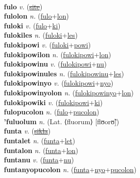  \label{fititelum} \\
\textbf{fulo} \textit{v.} (\hyperref[site]{\sout{site}})
 \label{fulo} \\
\textbf{fulolon} \textit{n.} (\hyperref[fulo]{fulo}+\hyperref[lon]{lon})
 \label{fulolon} \\
\textbf{fuloki} \textit{v.} (\hyperref[fulo]{fulo}+\hyperref[ki]{ki})
 \label{fuloki} \\
\textbf{fulokiles} \textit{n.} (\hyperref[fuloki]{fuloki}+\hyperref[les]{les})
 \label{fulokiles} \\
\textbf{fulokipowi} \textit{v.} (\hyperref[fuloki]{fuloki}+\hyperref[powi]{powi})
 \label{fulokipowi} \\
\textbf{fulokipowilon} \textit{n.} (\hyperref[fulokipowi]{fulokipowi}+\hyperref[lon]{lon})
 \label{fulokipowilon} \\
\textbf{fulokipowinu} \textit{v.} (\hyperref[fulokipowi]{fulokipowi}+\hyperref[nu]{nu})
 \label{fulokipowinu} \\
\textbf{fulokipowinules} \textit{n.} (\hyperref[fulokipowinu]{fulokipowinu}+\hyperref[les]{les})
 \label{fulokipowinules} \\
\textbf{fulokipowinyo} \textit{v.} (\hyperref[fulokipowi]{fulokipowi}+\hyperref[nyo]{nyo})
 \label{fulokipowinyo} \\
\textbf{fulokipowinyolon} \textit{n.} (\hyperref[fulokipowinyo]{fulokipowinyo}+\hyperref[lon]{lon})
 \label{fulokipowinyolon} \\
\textbf{fulokipowiki} \textit{v.} (\hyperref[fulokipowi]{fulokipowi}+\hyperref[ki]{ki})
 \label{fulokipowiki} \\
\textbf{fulopucolon} \textit{n.} (\hyperref[fulo]{fulo}+\hyperref[pucolon]{pucolon})
 \label{fulopucolon} \\
\textbf{'fuluolum} \textit{n.} (Lat. ⟨fluorum⟩ [flʊorʊ̃])
 \label{'fuluolum} \\
\textbf{funta} \textit{v.} (\hyperref[sikla]{\sout{sikla}})
 \label{funta} \\
\textbf{funtalet} \textit{n.} (\hyperref[funta]{funta}+\hyperref[let]{let})
 \label{funtalet} \\
\textbf{funtalon} \textit{n.} (\hyperref[funta]{funta}+\hyperref[lon]{lon})
 \label{funtalon} \\
\textbf{funtanu} \textit{v.} (\hyperref[funta]{funta}+\hyperref[nu]{nu})
 \label{funtanu} \\
\textbf{funtanyopucolon} \textit{n.} (\hyperref[funta]{funta}+\hyperref[nyo]{nyo}+\hyperref[pucolon]{pucolon})
 \label{funtanyopucolon} \\
